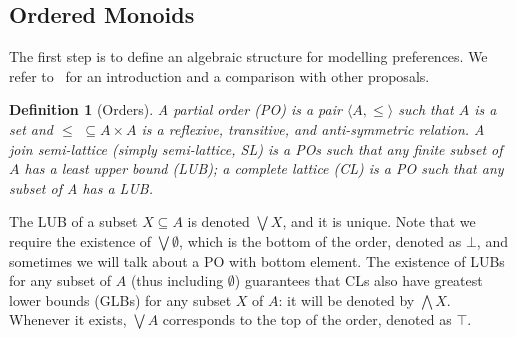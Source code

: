 \documentclass[a4paper]{elsarticle}
\newtheorem{definition}{Definition}
\newcommand{\1}{\mathbf{1}}
\begin{document}
\subsection{Ordered Monoids}
\label{sec:lem}

The first step is to define an algebraic structure for modelling preferences. 
We refer to~\cite{ipl} %
for an introduction and a comparison with other proposals.

\begin{definition}[Orders]
	A partial order (PO) is a pair $\langle A, \leq \rangle$ such that
	$A$ is a set %
	and $\leq \,\,\subseteq A \times A$ is a reflexive, transitive, and
	anti-symmetric  relation.
	A join semi-lattice (simply semi-lattice, SL) is a POs
	such that any finite subset of $A$ has a least upper bound (LUB);
	a complete lattice (CL) is a PO such that any subset of A has a LUB.
\end{definition}

The LUB of a subset $X \subseteq A$ is denoted $\bigvee X$, and it is unique. 
Note that we require the existence of $\bigvee \emptyset$, which is the bottom
of the order, denoted as $\bot$, and sometimes we will talk about a PO with bottom element.
The existence of LUBs for any subset of $A$ (thus including $\emptyset$) guarantees that 
CLs also have greatest lower bounds (GLBs) for any subset $X$ of $A$: 
it will be denoted by $\bigwedge X$. 
Whenever it exists, 
$\bigvee A$ corresponds to the top of the order, denoted as $\top$.
%

%

\end{document}
